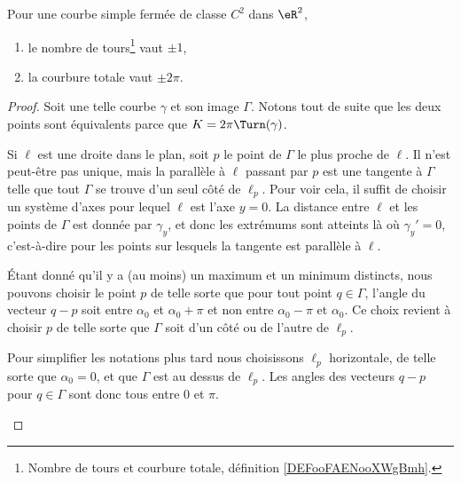 \begin{theorem}      \label{THOooEQWOooBCRMMZ}
	Pour une courbe simple fermée de classe \( C^2\) dans \( \eR^2\),
	\begin{enumerate}
		\item
		      le nombre de tours\footnote{Nombre de tours et courbure totale, définition \ref{DEFooFAENooXWgBmh}.} vaut \( \pm 1\),
		\item
		      la courbure totale vaut \( \pm 2\pi\).
	\end{enumerate}
\end{theorem}

\begin{proof}
	Soit une telle courbe \( \gamma\) et son image \( \Gamma\). Notons tout de suite que les deux points sont équivalents parce que \( K=2\pi\Turn(\gamma)\).
	\begin{subproof}

		Si \( \ell\) est une droite dans le plan, soit \( p\) le point de \( \Gamma\) le plus proche de \( \ell\). Il n'est peut-être pas unique, mais la parallèle à \( \ell\) passant par \( p\) est une tangente à \( \Gamma\) telle que tout \( \Gamma\) se trouve d'un seul côté de \( \ell_p\). Pour voir cela, il suffit de choisir un système d'axes pour lequel \( \ell\) est l'axe \( y=0\). La distance entre \( \ell\) et les points de \( \Gamma\) est donnée par \( \gamma_y\), et donc les extrémums sont atteints là où \( \gamma_y'=0\), c'est-à-dire pour les points sur lesquels la tangente est parallèle à \( \ell\).

		Étant donné qu'il y a (au moins) un maximum et un minimum distincts, nous pouvons choisir le point \( p\) de telle sorte que pour tout point \( q\in \Gamma\), l'angle du vecteur \( q-p\) soit entre \( \alpha_0\) et \( \alpha_0+\pi\) et non entre \( \alpha_0-\pi\) et \( \alpha_0\). Ce choix revient à choisir \( p\) de telle sorte que \( \Gamma\) soit d'un côté ou de l'autre de \( \ell_p\).

		Pour simplifier les notations plus tard nous choisissons \( \ell_p\) horizontale, de telle sorte que \( \alpha_0=0\), et que \( \Gamma\) est au dessus de \( \ell_p\). Les angles des vecteurs \( q-p\) pour \( q\in \Gamma\) sont donc tous entre \( 0\) et \( \pi\).



\end{subproof}
\end{proof}
